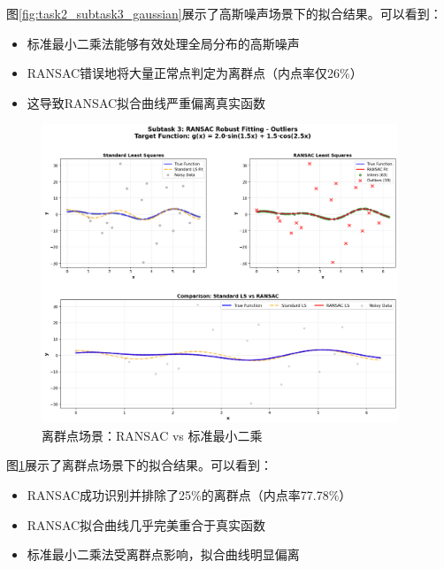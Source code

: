 \documentclass[a4paper,12pt]{article}
\theoremstyle{definition}
\begin{document}
图\ref{fig:task2_subtask3_gaussian}展示了高斯噪声场景下的拟合结果。可以看到：
\begin{itemize}
    \item 标准最小二乘法能够有效处理全局分布的高斯噪声
    \item RANSAC错误地将大量正常点判定为离群点（内点率仅26\%）
    \item 这导致RANSAC拟合曲线严重偏离真实函数
\end{itemize}

\begin{figure}[H]
\centering
\includegraphics[width=0.95\textwidth]{results/task2/subtask3/comparison_outliers.png}
\caption{离群点场景：RANSAC vs 标准最小二乘}
\label{fig:task2_subtask3_outliers}
\end{figure}

图\ref{fig:task2_subtask3_outliers}展示了离群点场景下的拟合结果。可以看到：
\begin{itemize}
    \item RANSAC成功识别并排除了25\%的离群点（内点率77.78\%）
    \item RANSAC拟合曲线几乎完美重合于真实函数
    \item 标准最小二乘法受离群点影响，拟合曲线明显偏离
\end{itemize}
\end{document}
